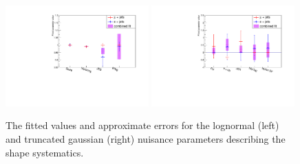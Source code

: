 \begin{figure}[ht!]
    \includegraphics[width=0.49\textwidth]{images/Run1/FitParams_compare_lognorm.pdf}
      \includegraphics[width=0.49\textwidth]{images/Run1/FitParams_compare_truncgaus.pdf}
    \caption{The fitted values and approximate errors for the lognormal (left) and truncated gaussian (right) nuisance parameters describing the shape systematics.}
    \label{fig:comparefittedparams}
\end{figure}




